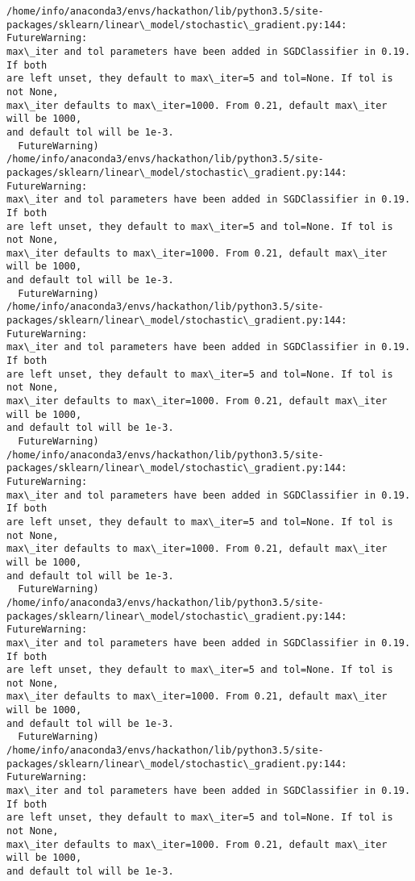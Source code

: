 \documentclass[11pt]{article}
\begin{document}
    \begin{Verbatim}[commandchars=\\\{\}]
/home/info/anaconda3/envs/hackathon/lib/python3.5/site-
packages/sklearn/linear\_model/stochastic\_gradient.py:144: FutureWarning:
max\_iter and tol parameters have been added in SGDClassifier in 0.19. If both
are left unset, they default to max\_iter=5 and tol=None. If tol is not None,
max\_iter defaults to max\_iter=1000. From 0.21, default max\_iter will be 1000,
and default tol will be 1e-3.
  FutureWarning)
/home/info/anaconda3/envs/hackathon/lib/python3.5/site-
packages/sklearn/linear\_model/stochastic\_gradient.py:144: FutureWarning:
max\_iter and tol parameters have been added in SGDClassifier in 0.19. If both
are left unset, they default to max\_iter=5 and tol=None. If tol is not None,
max\_iter defaults to max\_iter=1000. From 0.21, default max\_iter will be 1000,
and default tol will be 1e-3.
  FutureWarning)
/home/info/anaconda3/envs/hackathon/lib/python3.5/site-
packages/sklearn/linear\_model/stochastic\_gradient.py:144: FutureWarning:
max\_iter and tol parameters have been added in SGDClassifier in 0.19. If both
are left unset, they default to max\_iter=5 and tol=None. If tol is not None,
max\_iter defaults to max\_iter=1000. From 0.21, default max\_iter will be 1000,
and default tol will be 1e-3.
  FutureWarning)
/home/info/anaconda3/envs/hackathon/lib/python3.5/site-
packages/sklearn/linear\_model/stochastic\_gradient.py:144: FutureWarning:
max\_iter and tol parameters have been added in SGDClassifier in 0.19. If both
are left unset, they default to max\_iter=5 and tol=None. If tol is not None,
max\_iter defaults to max\_iter=1000. From 0.21, default max\_iter will be 1000,
and default tol will be 1e-3.
  FutureWarning)
/home/info/anaconda3/envs/hackathon/lib/python3.5/site-
packages/sklearn/linear\_model/stochastic\_gradient.py:144: FutureWarning:
max\_iter and tol parameters have been added in SGDClassifier in 0.19. If both
are left unset, they default to max\_iter=5 and tol=None. If tol is not None,
max\_iter defaults to max\_iter=1000. From 0.21, default max\_iter will be 1000,
and default tol will be 1e-3.
  FutureWarning)
/home/info/anaconda3/envs/hackathon/lib/python3.5/site-
packages/sklearn/linear\_model/stochastic\_gradient.py:144: FutureWarning:
max\_iter and tol parameters have been added in SGDClassifier in 0.19. If both
are left unset, they default to max\_iter=5 and tol=None. If tol is not None,
max\_iter defaults to max\_iter=1000. From 0.21, default max\_iter will be 1000,
and default tol will be 1e-3.

\end{Verbatim}
\end{document}
